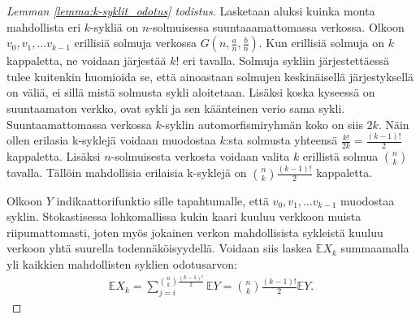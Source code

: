 \documentclass[finnish,12pt,a4paper,pdftex,sci,utf8]{aaltothesis}
\begin{document}
\begin{proof}[Lemman \ref{lemma:k-syklit_odotus} todistus]
	Lasketaan aluksi kuinka monta mahdollista eri $k$-sykliä on $n$-solmuisessa suuntaaamattomassa verkossa. Olkoon $v_0, v_1, \ldots v_{k-1}$ erillisiä solmuja verkossa $G(n,\frac{a}{n},\frac{b}{n})$. Kun erillisiä solmuja on $k$ kappaletta, ne voidaan järjestää $k!$ eri tavalla. Solmuja sykliin järjestettäessä tulee kuitenkin huomioida se, että ainoastaan solmujen keskinäisellä järjestyksellä on väliä, ei sillä mistä solmusta sykli aloitetaan. Lisäksi koska kyseessä on suuntaamaton verkko, ovat sykli ja sen käänteinen verio sama sykli. Suuntaamattomassa verkossa $k$-syklin automorfismiryhmän koko on siis $2k$. Näin ollen erilasia k-syklejä voidaan muodostaa $k$:sta solmusta yhteensä $\frac{k!}{2k} = \frac{(k-1)!}{2}$ kappaletta. Lisäksi $n$-solmuisesta verkosta voidaan valita $k$ erillistä solmua $\binom{n}{k}$ tavalla. Tällöin mahdollisia erilaisia k-syklejä on $\binom{n}{k} \frac{(k-1)!}{2}$ kappaletta.
	
	Olkoon $Y$ indikaattorifunktio sille tapahtumalle, että $v_0, v_1, \ldots v_{k-1}$ muodostaa syklin. Stokastisessa lohkomallissa kukin kaari kuuluu verkkoon muista riipumattomasti, joten myös jokainen verkon mahdollisista sykleistä kuuluu verkoon yhtä suurella todennäköisyydellä. Voidaan siis laskea $\mathbb{E}X_k$ summaamalla yli kaikkien mahdollisten syklien odotusarvon:
	\begin{align*}
		\mathbb{E} X_k = \sum_{j = i}^{\binom{n}{k} \frac{(k-1)!}{2}} \mathbb{E} Y = \binom{n}{k} \frac{(k-1)!}{2} \mathbb{E} Y.
	\end{align*}


\end{proof}
\end{document}
